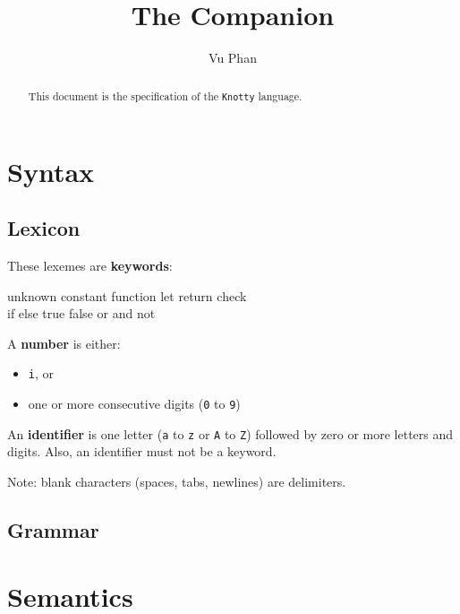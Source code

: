 \documentclass[letterpaper, 12pt]{extarticle}
\title{The \kn{} Companion}
\author{Vu Phan}
\theoremstyle{definition} %
\newcommand{\textdef}[1]{\textbf{#1}}
\newcommand{\code}[1]{\texttt{#1}}
\newcommand{\kn}{\code{Knotty}}
\newenvironment{codeblock}
    {\begin{addmargin}{0.5in} \ttfamily}
    {\end{addmargin} \par}
\begin{document}
\maketitle

\begin{abstract}
This document is the specification of the \kn{} language.
\end{abstract}

\tableofcontents

\thispagestyle{fancy}


\section{Syntax}


\subsection{Lexicon}

These lexemes are \textdef{keywords}:
\begin{codeblock}
unknown constant function let return check \\
if else true false or and not
\end{codeblock}

A \textdef{number} is either:
\begin{itemize}
\item \code{i}, or
\item one or more consecutive digits
(\code{0} to \code{9})
\end{itemize}

An \textdef{identifier} is one letter
(\code{a} to \code{z} or \code{A} to \code{Z})
followed by zero or more letters and digits.
Also, an identifier must not be a keyword.

Note: blank characters (spaces, tabs, newlines)
are delimiters.


\subsection{Grammar}


\section{Semantics}

\end{document}
